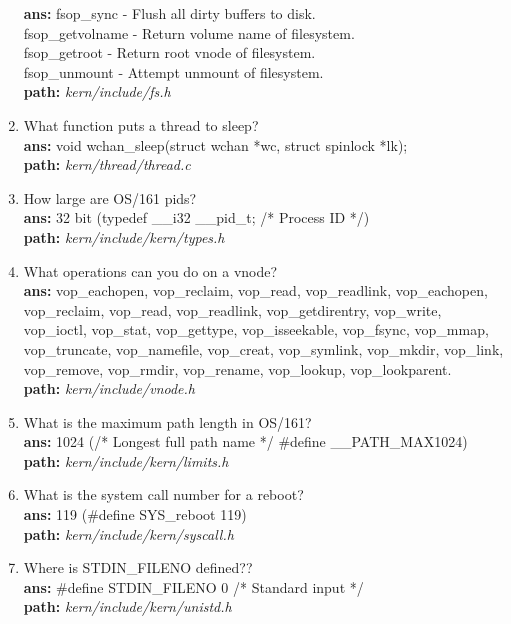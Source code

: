 \documentclass[14pt, a4paper]{article}
\begin{document}
\begin{enumerate}
          \textbf{ans: } fsop\_sync - Flush all dirty buffers to disk.\\
                     fsop\_getvolname - Return volume name of filesystem.\\
                     fsop\_getroot - Return root vnode of filesystem.\\
                     fsop\_unmount - Attempt unmount of filesystem.\\
          \textbf{path:} \emph{kern/include/fs.h}
    \item What function puts a thread to sleep?\\
          \textbf{ans: } void wchan\_sleep(struct wchan *wc, struct spinlock *lk);\\
          \textbf{path:} \emph{kern/thread/thread.c}
    \item How large are OS/161 pids?\\
          \textbf{ans: } 32 bit (typedef \_\_i32 \_\_pid\_t; /* Process ID */)\\
          \textbf{path:} \emph{kern/include/kern/types.h}
    \item What operations can you do on a vnode?\\
          \textbf{ans: } vop\_eachopen, vop\_reclaim, vop\_read, vop\_readlink, vop\_eachopen, vop\_reclaim, vop\_read, vop\_readlink, vop\_getdirentry, vop\_write, vop\_ioctl, vop\_stat, vop\_gettype, vop\_isseekable, vop\_fsync, vop\_mmap, vop\_truncate, vop\_namefile, vop\_creat, vop\_symlink, vop\_mkdir, vop\_link, vop\_remove, vop\_rmdir, vop\_rename, vop\_lookup, vop\_lookparent.\\
          \textbf{path:} \emph{kern/include/vnode.h}
    \item What is the maximum path length in OS/161?\\
          \textbf{ans: } 1024 (/* Longest full path name */ \#define \_\_PATH\_MAX1024)\\
          \textbf{path:} \emph{ kern/include/kern/limits.h}
    \item What is the system call number for a reboot?\\
          \textbf{ans: } 119 (\#define SYS\_reboot 119)\\
          \textbf{path:} \emph{kern/include/kern/syscall.h}
    \item Where is STDIN\_FILENO defined??\\
          \textbf{ans: } \#define STDIN\_FILENO 0 /* Standard input */\\
          \textbf{path:} \emph{kern/include/kern/unistd.h}

\end{enumerate}
\end{document}
